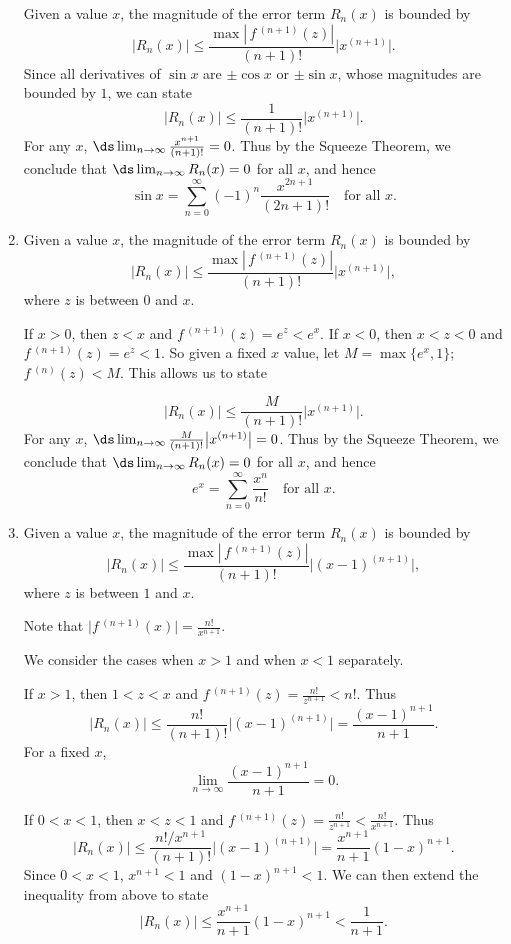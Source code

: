 \begin{enumialphparenastyle}
\begin{ex}
\begin{sol}
\begin{enumerate}
{Given a value $x$, the magnitude of the error term $R_n(x)$ is bounded by
$$ \big|R_n(x)\big| \leq \frac{\max\left|\,f\,^{(n+1)}(z)\right|}{(n+1)!}\big|x^{(n+1)}\big|.$$
Since all derivatives of $\sin x$ are $\pm \cos x$ or $\pm\sin x$, whose magnitudes are bounded by $1$, we can state
$$ \big|R_n(x)\big| \leq \frac{1}{(n+1)!}\big|x^{(n+1)}\big|.$$
For any $x$, $\ds\lim_{n\to\infty} \frac{x^{n+1}}{(n+1)!} = 0$. Thus by the Squeeze Theorem, we conclude that $\ds \lim_{n\to\infty} R_n(x) = 0$ for all $x$, and hence
$$\sin x = \sum_{n=0}^\infty (-1)^{n}\frac{x^{2n+1}}{(2n+1)!}\quad \text{for all $x$}.$$
}
\item 
{Given a value $x$, the magnitude of the error term $R_n(x)$ is bounded by
$$ \big|R_n(x)\big| \leq \frac{\max\left|\,f\,^{(n+1)}(z)\right|}{(n+1)!}\big|x^{(n+1)}\big|,$$
where $z$ is between $0$ and $x$. 

If $x>0$, then $z<x$ and $f\,^{(n+1)}(z) =e^z<e^x$. If $x<0$, then $x<z<0$ and $f\,^{(n+1)}(z) =e^z<1$. So given a fixed $x$ value, let $M = \max\{e^x,1\}$; $f\,^{(n)}(z)<M.$ This allows us to state

$$ \big|R_n(x)\big| \leq \frac{M}{(n+1)!}\big|x^{(n+1)}\big|.$$
For any $x$, $\ds\lim_{n\to\infty} \frac{M}{(n+1)!}\big|x^{(n+1)}\big|= 0$. Thus by the Squeeze Theorem, we conclude that $\ds \lim_{n\to\infty} R_n(x) = 0$ for all $x$, and hence
$$e^x = \sum_{n=0}^\infty \frac{x^{n}}{n!}\quad \text{for all $x$}.$$
}
\item 
{Given a value $x$, the magnitude of the error term $R_n(x)$ is bounded by
$$ \big|R_n(x)\big| \leq \frac{\max\left|\,f\,^{(n+1)}(z)\right|}{(n+1)!}\big|(x-1)^{(n+1)}\big|,$$
where $z$ is between $1$ and $x$. 

Note that $\big|f\,^{(n+1)}(x)\big| = \frac{n!}{x^{n+1}}$. 

We consider the cases when $x>1$ and when $x<1$ separately.

If $x>1$, then $1<z<x$ and $f\,^{(n+1)}(z) =\frac{n!}{z^{n+1}}<n!$. Thus
$$ \big|R_n(x)\big| \leq \frac{n!}{(n+1)!}\big|(x-1)^{(n+1)}\big|= \frac{(x-1)^{n+1}}{n+1}.$$
For a fixed $x$,
$$\lim_{n\to\infty} \frac{(x-1)^{n+1}}{n+1}=0.$$


If $0<x<1$, then $x<z<1$ and $f\,^{(n+1)}(z) =\frac{n!}{z^{n+1}}<\frac{n!}{x^{n+1}}$. Thus
$$ \big|R_n(x)\big| \leq \frac{n!/x^{n+1}}{(n+1)!}\big|(x-1)^{(n+1)}\big| = \frac{x^{n+1}}{n+1}(1-x)^{n+1}.$$
Since $0<x<1$, $x^{n+1}<1$ and $(1-x)^{n+1}<1$. We can then extend the inequality from above to state
$$\big|R_n(x)\big| \leq \frac{x^{n+1}}{n+1}(1-x)^{n+1}<\frac1{n+1}.$$

}
\end{enumerate}
\end{sol}
\end{ex}
\end{enumialphparenastyle}
